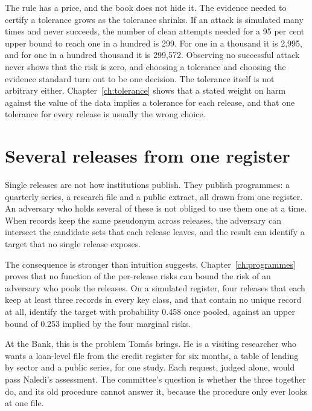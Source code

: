 The rule has a price, and the book does not hide it. The evidence needed to certify a
tolerance grows as the tolerance shrinks. If an attack is simulated many times and never
succeeds, the number of clean attempts needed for a 95 per cent upper bound to reach one in
a hundred is 299. For one in a thousand it is 2,995, and for one in a hundred thousand it is
299,572.
Observing no successful attack never shows that the risk is zero, and choosing a tolerance
and choosing the evidence standard turn out to be one decision. The tolerance itself is not
arbitrary either. Chapter~\ref{ch:tolerance} shows that a stated weight on harm against the
value of the data implies a tolerance for each release, and that one tolerance for every
release is usually the wrong choice.

\section{Several releases from one register}

Single releases are not how institutions publish. They publish programmes: a quarterly
series, a research file and a public extract, all drawn from one register. An adversary who
holds several of these is not obliged to use them one at a time. When records keep the same
pseudonym across releases, the adversary can intersect the candidate sets that each release
leaves, and the result can identify a target that no single release exposes.

The consequence is stronger than intuition suggests. Chapter~\ref{ch:programmes} proves that
no function of the per-release risks can bound the risk of an adversary who pools the
releases. On a simulated register, four releases that each keep at least three records in
every key class, and that contain no unique record at all, identify the target with
probability 0.458 once pooled, against an upper bound of 0.253 implied by the four marginal
risks.

At the Bank, this is the problem Tomás brings. He is a visiting researcher who wants a
loan-level file from the credit register for six months, a table of lending by sector and a
public series, for one study. Each request, judged alone, would pass Naledi's assessment. The committee's question is whether the three together do, and its old procedure cannot answer it, because the procedure only ever looks at one file.

